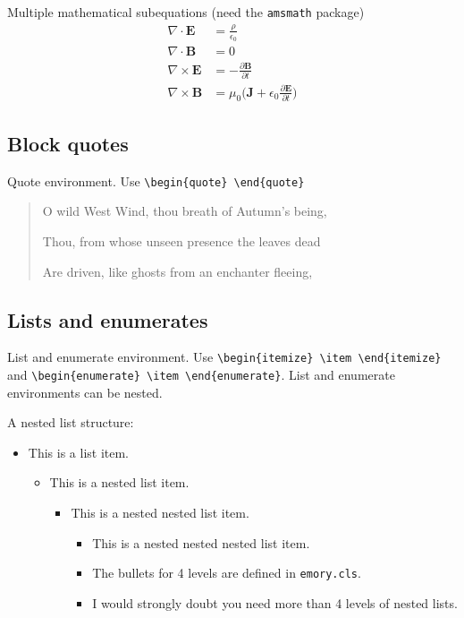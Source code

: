 \documentclass[final]{emory}
\begin{document}
Multiple mathematical subequations (need the \Verb|amsmath| package)
\begin{subequations}\label{math:sub}
\begin{align}
  \nabla\cdot\pmb{E}&=\frac{\rho}{\epsilon_0} \label{math:sub1}\\
  \nabla\cdot\pmb{B}&=0 \label{math:sub2} \\
  \nabla\times\pmb{E}&=-\frac{\partial\pmb{B}}{\partial t} \label{math:sub3}\\
  \nabla\times\pmb{B}&=\mu_0\Big(\pmb{J}+\epsilon_0\frac{\partial\pmb{E}}{\partial t}\Big) \label{math:sub4}
\end{align}
\end{subequations}

\subsection{Block quotes}
Quote environment. Use \Verb|\begin{quote} \end{quote}|

\begin{quote}\label{poet}
O wild West Wind, thou breath of Autumn's being,

Thou, from whose unseen presence the leaves dead

Are driven, like ghosts from an enchanter fleeing,
\end{quote}

\subsection{Lists and enumerates}
List and enumerate environment. Use \Verb|\begin{itemize} \item \end{itemize}|
and \Verb|\begin{enumerate} \item \end{enumerate}|. List and enumerate 
environments
can be nested.

A nested list structure:
\begin{itemize}
  \item This is a list item.
  \begin{itemize}
    \item This is a nested list item.
    \begin{itemize}
      \item This is a nested nested list item.
      \begin{itemize}
        \item This is a nested nested nested list item. 
        \item The bullets for 4 levels are defined in \Verb|emory.cls|.
        \item I would strongly doubt you need more than 4 levels of nested lists.
      \end{itemize}
    \end{itemize}
  \end{itemize}    
\end{itemize}
\end{document}
